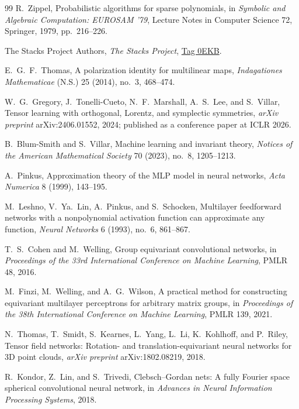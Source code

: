 \documentclass[11pt]{article}
\theoremstyle{definition}
\begin{document}
\begin{thebibliography}{99}
  R.~Zippel,
  Probabilistic algorithms for sparse polynomials,
  in \emph{Symbolic and Algebraic Computation: EUROSAM '79},
  Lecture Notes in Computer Science 72,
  Springer, 1979, pp.~216--226.


  The Stacks Project Authors,
  \emph{The Stacks Project},
  \href{https://stacks.math.columbia.edu/tag/0EKB}{Tag 0EKB}.

  E.~G.~F.~Thomas,
  A polarization identity for multilinear maps,
  \emph{Indagationes Mathematicae} (N.S.) 25 (2014), no.~3, 468--474.

  W.~G.~Gregory, J.~Tonelli-Cueto, N.~F.~Marshall, A.~S.~Lee, and S.~Villar,
  Tensor learning with orthogonal, Lorentz, and symplectic symmetries,
  \emph{arXiv preprint} arXiv:2406.01552, 2024; published as a conference paper at ICLR 2026.

  B.~Blum-Smith and S.~Villar,
  Machine learning and invariant theory,
  \emph{Notices of the American Mathematical Society} 70 (2023), no.~8, 1205--1213.

  A.~Pinkus,
  Approximation theory of the MLP model in neural networks,
  \emph{Acta Numerica} 8 (1999), 143--195.

  M.~Leshno, V.~Ya.~Lin, A.~Pinkus, and S.~Schocken,
  Multilayer feedforward networks with a nonpolynomial activation function can approximate any function,
  \emph{Neural Networks} 6 (1993), no.~6, 861--867.


  T.~S.~Cohen and M.~Welling,
  Group equivariant convolutional networks,
  in \emph{Proceedings of the 33rd International Conference on Machine Learning},
  PMLR 48, 2016.

  M.~Finzi, M.~Welling, and A.~G.~Wilson,
  A practical method for constructing equivariant multilayer perceptrons for arbitrary matrix groups,
  in \emph{Proceedings of the 38th International Conference on Machine Learning},
  PMLR 139, 2021.

  N.~Thomas, T.~Smidt, S.~Kearnes, L.~Yang, L.~Li, K.~Kohlhoff, and P.~Riley,
  Tensor field networks: Rotation- and translation-equivariant neural networks for 3D point clouds,
  \emph{arXiv preprint} arXiv:1802.08219, 2018.

  R.~Kondor, Z.~Lin, and S.~Trivedi,
  Clebsch--Gordan nets: A fully Fourier space spherical convolutional neural network,
  in \emph{Advances in Neural Information Processing Systems}, 2018.


\end{thebibliography}
\end{document}

